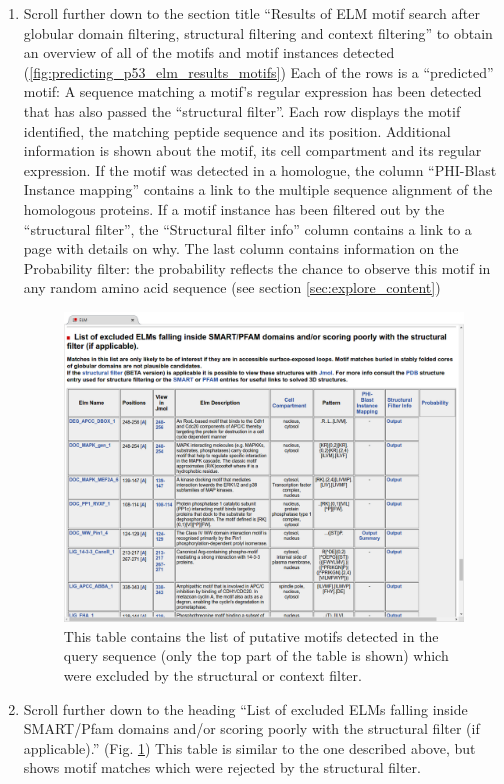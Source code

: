 \documentclass[12pt]{article}
\begin{document}
\begin{enumerate}
\item Scroll further down to the section title ``Results of ELM motif search
	after globular domain filtering, structural filtering and context
	filtering'' to obtain an overview of all of the motifs and motif
	instances detected
	(\ref{fig:predicting_p53_elm_results_motifs})
	Each of the rows is a ``predicted'' motif: A sequence matching a
	motif's regular expression has been detected that has also passed the
	``structural filter''.
	Each row displays the motif identified, the matching peptide
	sequence and its position. Additional information is shown about the
	motif, its cell compartment and its regular expression. If the motif
	was detected in a homologue, the column ``PHI-Blast Instance
	mapping'' contains a link to the multiple sequence alignment of the
	homologous proteins. If a motif instance has been filtered out 
	by the ``structural filter'', the ``Structural filter info'' column
	contains a link to a page with details on why.
	The last column contains information on the Probability filter: the
	probability reflects the chance to observe this motif in any random
	amino acid sequence (see section \ref{sec:explore_content})

\begin{figure}[h!]
\centering
	\includegraphics[width=\textwidth]{Figures/predicting_p53/elm_results_motifs_filtered.png}
	\caption{
	This table contains the list of putative motifs detected in the query sequence (only
	the top part of the table is shown) which were excluded by the
	structural or context filter.
	}
	\label{fig:predicting_p53_elm_results_motifs_filtered}
\end{figure}

\item Scroll further down to the heading ``List of excluded ELMs falling inside
	SMART/Pfam domains and/or scoring poorly with the structural filter (if
	applicable).''
	(Fig.  \ref{fig:predicting_p53_elm_results_motifs_filtered})
	This table is similar to the one described above, but shows motif
	matches which were rejected by the structural filter.
	
\end{enumerate}
\end{document}
